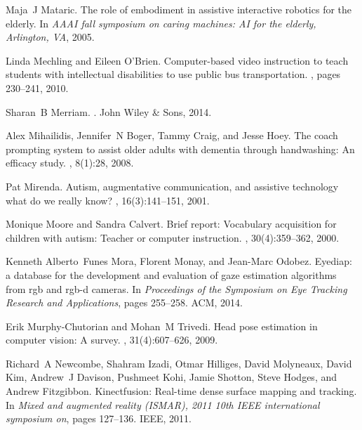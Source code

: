 \documentclass{ut-thesis}
\begin{document}
\begin{thebibliography}{100}
Maja~J Mataric.
\newblock The role of embodiment in assistive interactive robotics for the
  elderly.
\newblock In {\em AAAI fall symposium on caring machines: AI for the elderly,
  Arlington, VA}, 2005.

Linda Mechling and Eileen O'Brien.
\newblock Computer-based video instruction to teach students with intellectual
  disabilities to use public bus transportation.
, pages 230--241, 2010.

Sharan~B Merriam.
.
\newblock John Wiley \& Sons, 2014.

Alex Mihailidis, Jennifer~N Boger, Tammy Craig, and Jesse Hoey.
\newblock The coach prompting system to assist older adults with dementia
  through handwashing: An efficacy study.
, 8(1):28, 2008.

Pat Mirenda.
\newblock Autism, augmentative communication, and assistive technology what do
  we really know?
,
  16(3):141--151, 2001.

Monique Moore and Sandra Calvert.
\newblock Brief report: Vocabulary acquisition for children with autism:
  Teacher or computer instruction.
, 30(4):359--362,
  2000.

Kenneth Alberto~Funes Mora, Florent Monay, and Jean-Marc Odobez.
\newblock Eyediap: a database for the development and evaluation of gaze
  estimation algorithms from rgb and rgb-d cameras.
\newblock In {\em Proceedings of the Symposium on Eye Tracking Research and
  Applications}, pages 255--258. ACM, 2014.

Erik Murphy-Chutorian and Mohan~M Trivedi.
\newblock Head pose estimation in computer vision: A survey.
, 31(4):607--626, 2009.

Richard~A Newcombe, Shahram Izadi, Otmar Hilliges, David Molyneaux, David Kim,
  Andrew~J Davison, Pushmeet Kohi, Jamie Shotton, Steve Hodges, and Andrew
  Fitzgibbon.
\newblock Kinectfusion: Real-time dense surface mapping and tracking.
\newblock In {\em Mixed and augmented reality (ISMAR), 2011 10th IEEE
  international symposium on}, pages 127--136. IEEE, 2011.


\end{thebibliography}
\end{document}
